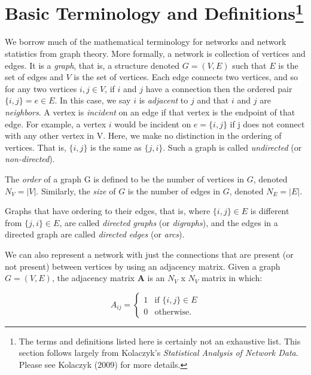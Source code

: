 \documentclass[12pt,twoside]{amherstthesis}
\begin{document}
  \section[Basic Terminology and Definitions]{\texorpdfstring{Basic
  Terminology and Definitions\footnote{The terms and definitions listed
    here is certainly not an exhaustive list. This section follows largely
    from Kolaczyk's \emph{Statistical Analysis of Network Data}. Please
    see Kolaczyk (2009) for more details.}}{Basic Terminology and Definitions}}\label{basic-terminology-and-definitions-1}
  
  We borrow much of the mathematical terminology for networks and network
  statistics from graph theory. More formally, a network is collection of
  vertices and edges. It is a \emph{graph}, that is, a structure denoted
  \(G = (V, E)\) such that \(E\) is the set of edges and \(V\) is the set
  of vertices. Each edge connects two vertices, and so for any two
  vertices \(i, j \in V\), if \(i\) and \(j\) have a connection then the
  ordered pair \(\{i, j\} = e \in E\). In this case, we say \(i\) is
  \emph{adjacent} to \(j\) and that \(i\) and \(j\) are \emph{neighbors}.
  A vertex is \emph{incident} on an edge if that vertex is the endpoint of
  that edge. For example, a vertex \(i\) would be incident on
  \(e = \{i, j\}\) if j does not connect with any other vertex in V. Here,
  we make no distinction in the ordering of vertices. That is,
  \(\{i, j\}\) is the same as \(\{j, i\}\). Such a graph is called
  \emph{undirected} (or \emph{non-directed}).
  
  The \emph{order} of a graph G is defined to be the number of vertices in
  \(G\), denoted \(N_V = |V|\). Similarly, the \emph{size} of \(G\) is the
  number of edges in \(G\), denoted \(N_E = |E|\).
  
  Graphs that have ordering to their edges, that is, where
  \(\{i, j\} \in E\) is different from \(\{j, i\} \in E\), are called
  \emph{directed graphs} (or \emph{digraphs}), and the edges in a directed
  graph are called \emph{directed edges} (or \emph{arcs}).
  
  We can also represent a network with just the connections that are
  present (or not present) between vertices by using an adjacency matrix.
  Given a graph \(G = (V, E)\), the adjacency matrix \(\textbf{A}\) is an
  \(N_V\) x \(N_V\) matrix in which:
  
  \[ A_{ij} = \begin{cases}
      1 & \text{if } \{i, j\} \in E \\
      0 & \text{otherwise.} 
    \end{cases}
  \]
  
\end{document}
